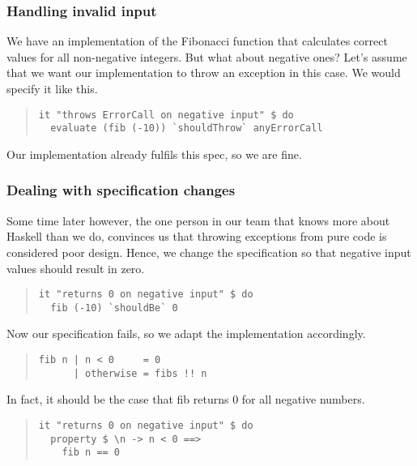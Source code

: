 \documentclass[preprint]{sigplanconf}
\begin{document}
\subsubsection{Handling invalid input}

We have an implementation of the Fibonacci function
that calculates correct values for all non-negative integers.
But what about negative ones? Let's assume that we want our
implementation to throw an exception in this case. We would
specify it like this.

\begin{quote}
\small
\begin{verbatim}
it "throws ErrorCall on negative input" $ do
  evaluate (fib (-10)) `shouldThrow` anyErrorCall
\end{verbatim}
\end{quote}

\noindent Our implementation already fulfils this spec, so we are
fine.

\subsubsection{Dealing with specification changes}

Some time later however, the one person in our team that knows
more about Haskell than we do, convinces us that throwing exceptions
from pure code is considered poor design. Hence, we change the
specification so that negative input values should result in zero.

\begin{quote}
\small
\begin{verbatim}
it "returns 0 on negative input" $ do
  fib (-10) `shouldBe` 0
\end{verbatim}
\end{quote}

\noindent Now our specification fails, so we adapt the implementation
accordingly.

\begin{quote}
\small
\begin{verbatim}
fib n | n < 0     = 0
      | otherwise = fibs !! n
\end{verbatim}
\end{quote}

\noindent In fact, it should be the case that fib returns 0 for all
negative numbers.

\begin{quote}
\small
\begin{verbatim}
it "returns 0 on negative input" $ do
  property $ \n -> n < 0 ==>
    fib n == 0
\end{verbatim}
\end{quote}
\end{document}
